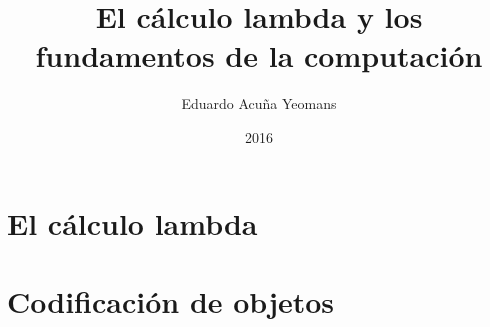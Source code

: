 \documentclass[letterpaper,twoside,openright]{book}
\theoremstyle{plain}%
\theoremstyle{definition}
\theoremstyle{remark}
\begin{document}
\title{El cálculo lambda y los fundamentos de la computación}
\author{Eduardo Acuña Yeomans}
\date{2016}

\maketitle

\frontmatter
\tableofcontents

\mainmatter
\chapter{El cálculo lambda}


\chapter{Codificación de objetos}


\appendix

\nocite{*}


\end{document}
